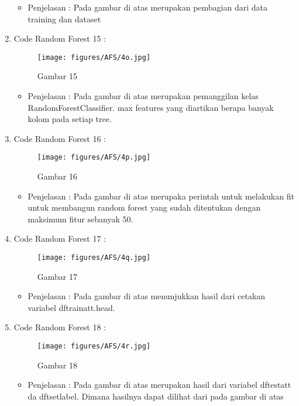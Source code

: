 \begin{enumerate}
\begin{itemize}
\item Penjelasan : Pada gambar di atas merupakan pembagian dari data training dan dataset
\par
\par
\end{itemize}
\item Code Random Forest 15 :
\par
\begin{figure}[ht] 
\centering
\texttt{[image: figures/AFS/4o.jpg]}
\caption{Gambar 15}
\label{contoh}
\end{figure}
\par
\begin{itemize} 
\item Penjelasan : Pada gambar di atas merupakan pemanggilan kelas RandomForestClassifier. max features yang diartikan berapa banyak kolom pada setiap tree.
\par
\par
\end{itemize}
\item Code Random Forest 16 :
\par
\begin{figure}[ht]
\centering
\texttt{[image: figures/AFS/4p.jpg]}
\caption{Gambar 16}
\label{contoh}
\end{figure}
\par
\begin{itemize}
\item Penjelasan : Pada gambar di atas merupaka perintah untuk melakukan fit untuk membangun random forest yang sudah ditentukan dengan maksimum fitur sebanyak 50.
\par
\par
\end{itemize}
\item Code Random Forest 17 :
\par
\begin{figure}[ht]
\centering
\texttt{[image: figures/AFS/4q.jpg]}
\caption{Gambar 17}
\label{contoh}
\end{figure}
\par
\begin{itemize}
\item Penjelasan : Pada gambar di atas menunjukkan hasil dari cetakan variabel dftrainatt.head.
\par
\par
\end{itemize}
\item Code Random Forest 18 :
\par
\begin{figure}[ht]
\centering
\texttt{[image: figures/AFS/4r.jpg]}
\caption{Gambar 18}
\label{contoh}
\end{figure}
\par
\begin{itemize}
\item Penjelasan : Pada gambar di atas merupakan hasil dari variabel dftestatt da dftsetlabel. Dimana hasilnya dapat dilihat dari pada gambar di atas
\par
\par
\end{itemize}


\end{enumerate}
